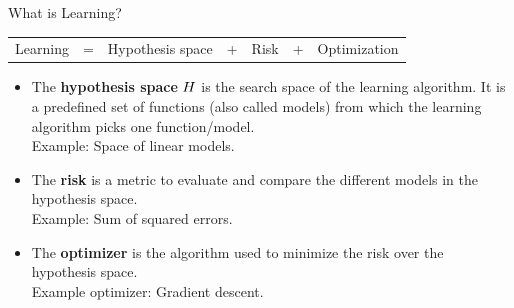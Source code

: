 \begin{vbframe}{What is Learning?}

\begin{center}
\begin{table}[]
\begin{tabular}{ccccccc}
 Learning & = & Hypothesis space & + & Risk & + & Optimization
\end{tabular}
\end{table}
\end{center}

\begin{itemize}
  \item The \textbf{hypothesis space} $H$ is the search space of the learning algorithm. It is a predefined set of functions (also called models) from which the learning algorithm picks one function/model. \\ \vspace{1mm}
  Example: Space of linear models. \vspace{3mm}
  \item The \textbf{risk} is a metric to evaluate and compare the different models in the hypothesis space. \\ \vspace{1mm}
  Example: Sum of squared errors. \vspace{3mm}
  \item The \textbf{optimizer} is the algorithm used to minimize the risk over the hypothesis space. \\ \vspace{1mm}
  Example optimizer: Gradient descent. \vspace{3mm}
\end{itemize}



\end{vbframe}





